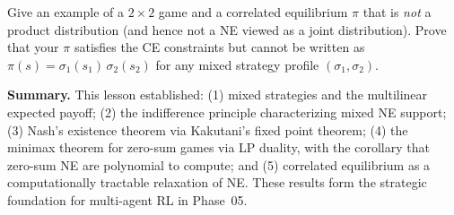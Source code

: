 \documentclass[11pt,a4paper]{article}
\begin{document}
\begin{exercise}[NE $\subsetneq$ CE]
\label{ex:ne_strict_subset}
Give an example of a $2 \times 2$ game and a correlated equilibrium $\pi$
that is \emph{not} a product distribution (and hence not a NE viewed as a
joint distribution). Prove that your $\pi$ satisfies the CE constraints but
cannot be written as $\pi(s) = \sigma_1(s_1)\, \sigma_2(s_2)$ for any
mixed strategy profile $(\sigma_1, \sigma_2)$.
\end{exercise}

\bigskip

\noindent\textbf{Summary.} This lesson established: (1) mixed strategies and
the multilinear expected payoff; (2) the indifference principle
characterizing mixed NE support; (3) Nash's existence theorem via Kakutani's
fixed point theorem; (4) the minimax theorem for zero-sum games via LP
duality, with the corollary that zero-sum NE are polynomial to compute; and
(5) correlated equilibrium as a computationally tractable relaxation of NE.
These results form the strategic foundation for multi-agent RL in Phase~05.

\bigskip

\end{document}
